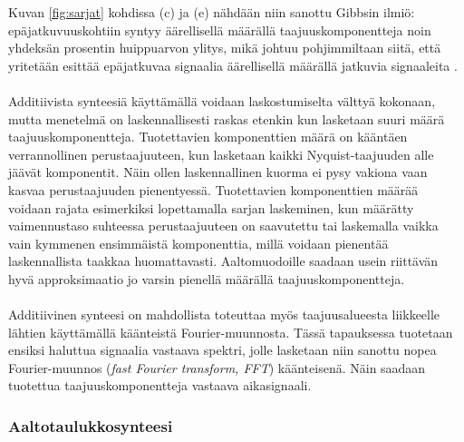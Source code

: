 \documentclass[finnish,12pt,a4paper,pdftex]{article} %
\begin{document}
Kuvan \ref{fig:sarjat} kohdissa (c) ja (e) nähdään niin sanottu Gibbsin ilmiö: epäjatkuvuuskohtiin syntyy äärellisellä määrällä taajuuskomponentteja noin yhdeksän prosentin huippuarvon ylitys, mikä johtuu pohjimmiltaan siitä, että yritetään esittää epäjatkuvaa signaalia äärellisellä määrällä jatkuvia signaaleita \cite{Sound}. \\\\
Additiivista synteesiä käyttämällä voidaan laskostumiselta välttyä kokonaan, mutta menetelmä on laskennallisesti raskas etenkin kun lasketaan suuri määrä taajuuskomponentteja. Tuotettavien komponenttien määrä on kääntäen verrannollinen perustaajuuteen, kun lasketaan kaikki Nyquist-taajuuden alle jäävät komponentit. Näin ollen laskennallinen kuorma ei pysy vakiona vaan kasvaa perustaajuuden pienentyessä. Tuotettavien komponenttien määrää voidaan rajata esimerkiksi lopettamalla sarjan laskeminen, kun määrätty vaimennustaso suhteessa perustaajuuteen on saavutettu tai laskemalla vaikka vain kymmenen ensimmäistä komponenttia, millä voidaan pienentää laskennallista taakkaa huomattavasti. Aaltomuodoille saadaan usein riittävän hyvä approksimaatio jo varsin pienellä määrällä taajuuskomponentteja. \cite{Pekonen2014, Nostalgia, Sound} \\\\
Additiivinen synteesi on mahdollista toteuttaa myös taajuusalueesta liikkeelle lähtien käyttämällä käänteistä Fourier-muunnosta. Tässä tapauksessa tuotetaan ensiksi haluttua signaalia vastaava spektri, jolle lasketaan niin sanottu nopea Fourier-muunnos (\textit{fast Fourier transform, FFT}) käänteisenä. Näin saadaan tuotettua taajuuskomponentteja vastaava aikasignaali. \cite{Pekonen2014, Stilson1996}

\subsubsection{Aaltotaulukkosynteesi}
\end{document}
